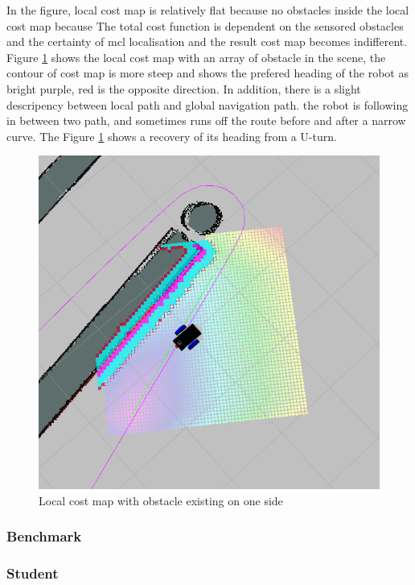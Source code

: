 \documentclass[10pt,journal,compsoc]{IEEEtran}
\begin{document}
In the figure, local cost map is relatively flat because no obstacles inside the local cost map because The total cost function is dependent on the sensored obstacles and the certainty of mcl localisation and the result cost map becomes indifferent. 
Figure \ref{fig:localcostmap} shows the local cost map with an array of obstacle in the scene, the contour of cost map is more steep and shows the prefered heading of the robot as bright purple, red is the opposite direction. In addition, there is a slight descripency between local path and global navigation path. the robot is following in between two path, and sometimes runs off the route before and after a narrow curve. The Figure \ref{fig:localcostmap} shows a recovery of its heading from a U-turn.
\begin{figure}[thpb]
      \centering
      \includegraphics[width=\linewidth]{./img/localcostmap.png}
      \caption{Local cost map with obstacle existing on one side}
      \label{fig:localcostmap}
\end{figure}
\subsubsection{Benchmark}
\subsubsection{Student}
\end{document}
